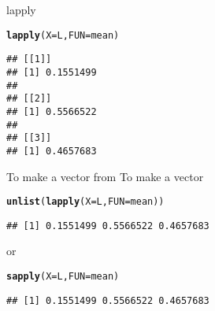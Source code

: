 \documentclass[aspectratio=169]{beamer}\usepackage[]{graphicx}\usepackage[]{xcolor}
\makeatletter
\newcommand{\hldef}[1]{\textcolor[rgb]{0.345,0.345,0.345}{#1}}%
\newcommand{\hlkwc}[1]{\textcolor[rgb]{0.333,0.667,0.333}{#1}}%
\newcommand{\hlkwd}[1]{\textcolor[rgb]{0.737,0.353,0.396}{\textbf{#1}}}%
\newenvironment{kframe}{%
 \def\at@end@of@kframe{}%
 \ifinner\ifhmode%
  \def\at@end@of@kframe{\end{minipage}}%
  \begin{minipage}{\columnwidth}%
 \fi\fi%
 \def\FrameCommand##1{\hskip\@totalleftmargin \hskip-\fboxsep
 \colorbox{shadecolor}{##1}\hskip-\fboxsep
     \hskip-\linewidth \hskip-\@totalleftmargin \hskip\columnwidth}%
 \MakeFramed {\advance\hsize-\width
   \@totalleftmargin\z@ \linewidth\hsize
   \@setminipage}}%
 {\par\unskip\endMakeFramed%
 \at@end@of@kframe}
\newenvironment{knitrout}{}{} %
\makeatother
\begin{document}
\begin{frame}[fragile]{lapply}
\begin{knitrout}
\color{fgcolor}\begin{kframe}
\begin{alltt}
\hlkwd{lapply}\hldef{(}\hlkwc{X} \hldef{= L,} \hlkwc{FUN} \hldef{= mean)}
\end{alltt}
\begin{verbatim}
## [[1]]
## [1] 0.1551499
## 
## [[2]]
## [1] 0.5566522
## 
## [[3]]
## [1] 0.4657683
\end{verbatim}
\end{kframe}
\end{knitrout}
\end{frame}

\begin{frame}[fragile]{To make a vector from }
To make a vector
\begin{knitrout}
\color{fgcolor}\begin{kframe}
\begin{alltt}
\hlkwd{unlist}\hldef{(}\hlkwd{lapply}\hldef{(}\hlkwc{X} \hldef{= L,} \hlkwc{FUN} \hldef{= mean))}
\end{alltt}
\begin{verbatim}
## [1] 0.1551499 0.5566522 0.4657683
\end{verbatim}
\end{kframe}
\end{knitrout}
or
\begin{knitrout}
\color{fgcolor}\begin{kframe}
\begin{alltt}
\hlkwd{sapply}\hldef{(}\hlkwc{X} \hldef{= L,} \hlkwc{FUN} \hldef{= mean)}
\end{alltt}
\begin{verbatim}
## [1] 0.1551499 0.5566522 0.4657683
\end{verbatim}
\end{kframe}
\end{knitrout}
\end{frame} 
\end{document}

